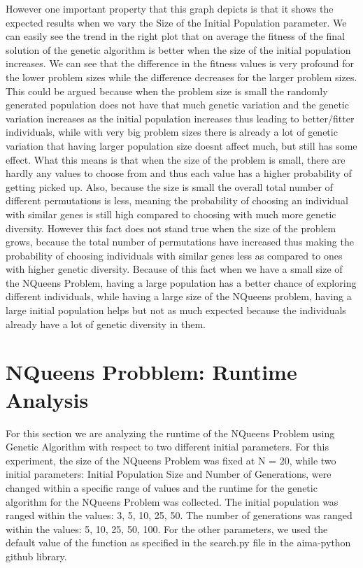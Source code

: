 \documentclass[11pt]{article}
\begin{document}
However one important property that this graph depicts is that it shows the expected results when we vary the Size of the Initial Population parameter. We can easily see the trend in the right plot that on average the fitness of the final solution of the genetic algorithm is better when the size of the initial population increases. We can see that the difference in the fitness values is very profound for the lower problem sizes while the difference decreases for the larger problem sizes. This could be argued because when the problem size is small the randomly generated population does not have that much genetic variation and the genetic variation increases as the initial population increases thus leading to better/fitter individuals, while with very big problem sizes there is already a lot of genetic variation that having larger population size doesnt affect much, but still has some effect. What this means is that when the size of the problem is small, there are hardly any values to choose from and thus each value has a higher probability of getting picked up. Also, because the size is small the overall total number of different permutations is less, meaning the probability of choosing an individual with similar genes is still high compared to choosing with much more genetic diversity. However this fact does not stand true when the size of the problem grows, because the total number of permutations have increased thus making the probability of choosing individuals with similar genes less as compared to ones with higher genetic diversity. Because of this fact when we have a small size of the NQueens Problem, having a large population has a better chance of exploring different individuals, while having a large size of the NQueens problem, having a large initial population helps but not as much expected because the individuals already have a lot of genetic diversity in them.


\section{NQueens Probblem: Runtime Analysis}

For this section we are analyzing the runtime of the NQueens Problem using Genetic Algorithm with respect to two different initial parameters.
For this experiment, the size of the NQueens Problem was fixed at N = 20, while two initial parameters: Initial Population Size and Number of Generations, 
were changed within a specific range of values and the runtime for the genetic algorithm for the NQueens Problem was collected.
The initial population was ranged within the values: 3, 5, 10, 25, 50.
The number of generations was ranged within the values: 5, 10, 25, 50, 100.
For the other parameters, we used the default value of the function as specified in the search.py file in the aima-python github library.
\end{document}
